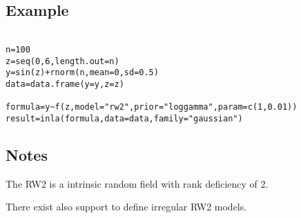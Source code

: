 \documentclass[a4paper,11pt]{article}
\begin{document}
\subsection*{Example}

\begin{verbatim}

n=100
z=seq(0,6,length.out=n)
y=sin(z)+rnorm(n,mean=0,sd=0.5)
data=data.frame(y=y,z=z)

formula=y~f(z,model="rw2",prior="loggamma",param=c(1,0.01))
result=inla(formula,data=data,family="gaussian")
\end{verbatim}


\subsection*{Notes}

The RW2 is a intrinsic random field with rank deficiency of 2.

There exist also support to define irregular RW2 models. 
\end{document}
